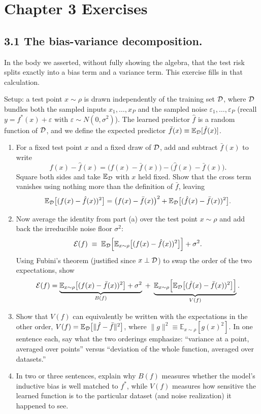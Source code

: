 \section*{Chapter 3 Exercises}

\subsection*{3.1 The bias-variance decomposition.}
In the body we asserted, without fully showing the algebra, that the test risk
splits exactly into a bias term and a variance term. This exercise fills in
that calculation.

Setup: a test point $x\sim \rho$ is drawn independently of the training set
$\mathcal{D}$, where $\mathcal{D}$ bundles both the sampled inputs $x_1,\dots,x_P$ and the
sampled noise $\varepsilon_1,\dots,\varepsilon_P$ (recall $y = f^*(x)+\varepsilon$ with
$\varepsilon\sim N(0,\sigma^2)$). The learned predictor $\hat f$ is a random
function of $\mathcal{D}$, and we define the expected predictor $\bar f(x) \equiv
\mathbb{E}_{\mathcal{D}}[\hat f(x)]$.

\begin{enumerate}[label=\alph*)]
    \item For a fixed test point $x$ and a fixed draw of $\mathcal{D}$, add and
    subtract $\bar f(x)$ to write
    \[
    f(x) - \hat f(x) = \big(f(x) - \bar f(x)\big) - \big(\hat f(x) - \bar f(x)\big).
    \]
    Square both sides and take $\mathbb{E}_{\mathcal{D}}$ with $x$ held fixed. Show
    that the cross term vanishes using nothing more than the definition of
    $\bar f$, leaving
    \[
    \mathbb{E}_{\mathcal{D}}\big[(f(x)-\hat f(x))^2\big]
    = \big(f(x)-\bar f(x)\big)^2 + \mathbb{E}_{\mathcal{D}}\big[(\hat f(x)-\bar f(x))^2\big].
    \]
    \item Now average the identity from part (a) over the test point
    $x\sim \rho$ and add back the irreducible noise floor $\sigma^2$:
    \[
    \mathcal{E}(f) \;\equiv\; \mathbb{E}_{\mathcal{D}}\Big[\mathbb{E}_{x\sim \rho}\big[(f(x)-\hat f(x))^2\big]\Big] + \sigma^2.
    \]
    Using Fubini's theorem (justified since $x \perp \mathcal{D}$) to swap the order
    of the two expectations, show
    \[
    \mathcal{E}(f) = \underbrace{\mathbb{E}_{x\sim \rho}\big[(f(x)-\bar f(x))^2\big] + \sigma^2}_{B(f)}
    \;+\; \underbrace{\mathbb{E}_{x\sim \rho}\Big[\mathbb{E}_{\mathcal{D}}\big[(\hat f(x)-\bar f(x))^2\big]\Big]}_{V(f)}.
    \]
    \item Show that $V(f)$ can equivalently be written with the expectations
    in the other order, $V(f) = \mathbb{E}_{\mathcal{D}}\big[\|\hat f - \bar f\|^2\big]$,
    where $\|g\|^2 \equiv \mathbb{E}_{x\sim \rho}[g(x)^2]$. In one sentence each,
    say what the two orderings emphasize: ``variance at a point, averaged over
    points'' versus ``deviation of the whole function, averaged over
    datasets.''
    \item In two or three sentences, explain why $B(f)$ measures whether the
    model's inductive bias is well matched to $f^*$, while $V(f)$ measures how
    sensitive the learned function is to the particular dataset (and noise
    realization) it happened to see.
\end{enumerate}
